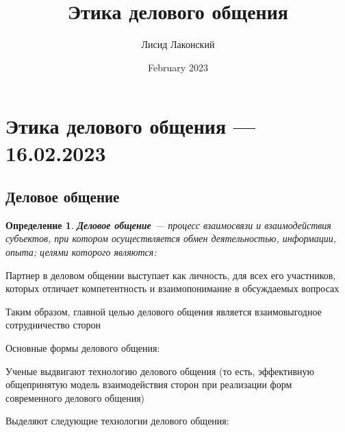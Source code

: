 \documentclass{article}
\title{Этика делового общения}
\author{Лисид Лаконский}
\date{February 2023}
\newtheorem{definition}{Определение}
\begin{document}
\raggedright

\maketitle
\tableofcontents
\pagebreak

\section{Этика делового общения — 16.02.2023}

\subsection{Деловое общение}

\begin{definition}
    \textbf{Деловое общение} — процесс взаимосвязи и взаимодействия субъектов, при котором осуществляется обмен деятельностью, информации, опыта; целями которого являются:
    \begin{multienumerate}
    \end{multienumerate}
\end{definition}

Партнер в деловом общении выступает как личность, для всех его участников, которых отличает компетентность и взаимопонимание в обсуждаемых вопросах

Таким образом, главной целью делового общения является взаимовыгодное сотрудничество сторон

Основные формы делового общения:
\begin{multienumerate}
\end{multienumerate}

Ученые выдвигают технологию делового общения (то есть, эффективную общепринятую модель взаимодействия сторон при реализации форм современного делового общения)

Выделяют следующие технологии делового общения:
\begin{multienumerate}
\end{multienumerate}
\end{document}
